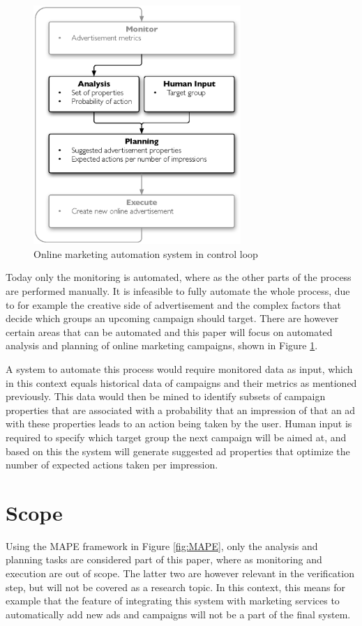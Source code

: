 \documentclass[a4paper]{article}
\begin{document}
\begin{figure}[h!]
\centering
\includegraphics[width=0.7\textwidth]{mape-marketing.eps}
\caption{Online marketing automation system in control loop}
\label{fig:MAPEMarketing}
\end{figure}

Today only the monitoring is automated, where as the other parts of the process are performed manually. It is infeasible to fully
automate the whole process, due to for example the creative side of advertisement and the complex factors that decide which groups
an upcoming campaign should target. There are however certain areas that can be automated and this paper will focus on automated
analysis and planning of online marketing campaigns, shown in Figure \ref{fig:MAPEMarketing}.

A system to automate this process would require monitored data as input, which in this context equals historical data of campaigns
and their metrics as mentioned previously. This data would then be mined to identify subsets of campaign properties that are
associated with a probability that an impression of that an ad with these properties leads to an action being taken by the user.
Human input is required to specify which target group the next campaign will be aimed at, and based on this the system will
generate suggested ad properties that optimize the number of expected actions taken per impression.

\section{Scope}
Using the MAPE framework in Figure \ref{fig:MAPE}, only the analysis and planning tasks are considered part of this paper, where
as monitoring and execution are out of scope. The latter two are however relevant in the verification step, but will not be
covered as a research topic. In this context, this means for example that the feature of integrating this system with marketing
services to automatically add new ads and campaigns will not be a part of the final system.
\end{document}
